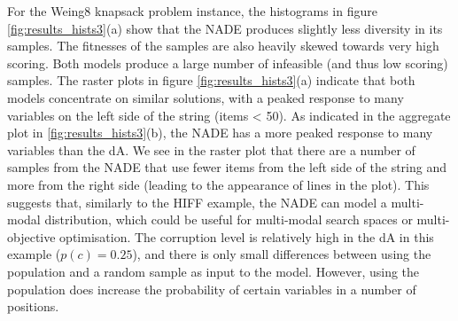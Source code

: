 \documentclass[twoside]{article}
\begin{document}
For the Weing8 knapsack problem instance, the histograms in figure \ref{fig:results_hists3}(a) show that the NADE produces slightly less diversity in its samples. The fitnesses of the samples are also heavily skewed towards very high scoring. Both models produce a large number of infeasible (and thus low scoring) samples. The raster plots in figure \ref{fig:results_hists3}(a) indicate that both models concentrate on similar solutions, with a peaked response to many variables on the left side of the string (items < 50). As indicated in the aggregate plot in \ref{fig:results_hists3}(b), the NADE has a more peaked response to many variables than the dA. We see in the raster plot that there are a number of samples from the NADE that use fewer items from the left side of the string and more from the right side (leading to the appearance of lines in the plot). This suggests that, similarly to the HIFF example, the NADE can model a multi-modal distribution, which could be useful for multi-modal search spaces or multi-objective optimisation. The corruption level is relatively high in the dA in this example (\(p(c)=0.25\)), and there is only small differences between using the population and a random sample as input to the model. However, using the population does increase the probability of certain variables in a number of positions.
 
\end{document}
